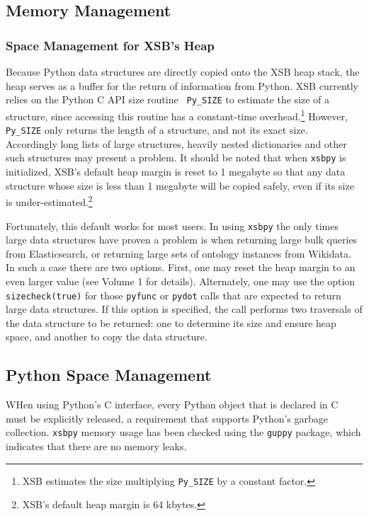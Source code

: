\subsection{Memory Management} \label{sec:xsbpy-memory}

\subsubsection{Space Management for XSB's Heap}
Because Python data structures are directly copied onto the XSB heap
stack, the heap serves as a buffer for the return of information from
Python.  XSB currently relies on the Python C API size routine {\tt
  Py\_SIZE} to estimate the size of a structure, since accessing this
routine has a constant-time overhead.\footnote{XSB estimates the size
  multiplying {\tt Py\_SIZE} by a constant factor.}  However, {\tt
  Py\_SIZE} only returns the length of a structure, and not its exact
size.  Accordingly long lists of large structures, heavily nested
dictionaries and other such structures may present a problem.  It
should be noted that when {\tt xsbpy} is initialized, XSB's default
heap margin is reset to 1 megabyte so that any data structure whose
size is less than 1 megabyte will be copied safely, even if its size
is under-estimated.\footnote{XSB's default heap margin is 64 kbytes.}

Fortunately, this default works for most users.  In using {\tt xsbpy}
the only times large data structures have proven a problem is when
returning large bulk queries from Elasticsearch, or returning large
sets of ontology instances from Wikidata.  In such a case there are
two options.  First, one may reset the heap margin to an even larger
value (see Volume 1 for details).  Alternately, one may use the option
{\tt sizecheck(true)} for those {\tt pyfunc} or {\tt pydot} calls that
are expected to return large data structures.  If this option is
specified, the call performs two traversals of the data structure to
be returned: one to determine its size and ensure heap space, and another
to copy the data structure.

\subsection{Python Space Management}

WHen using Python's C interface, every Python object that is declared
in C must be explicitly released, a requirement that supports Python's
garbage collection.  {\tt xsbpy} memory usage has been checked using
the {\tt guppy} package, which indicates that there are no memory
leaks.

